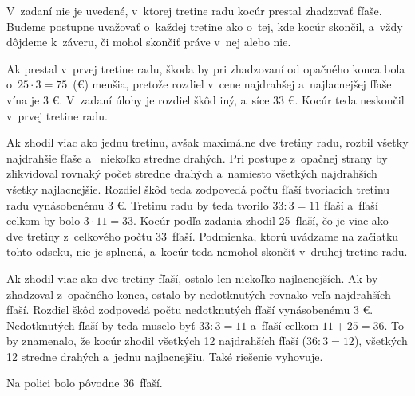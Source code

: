 {%
V~zadaní nie je uvedené, v~ktorej tretine radu kocúr prestal zhadzovať fľaše.
Budeme postupne uvažovať o~každej tretine ako o~tej, kde kocúr skončil, a~vždy
dôjdeme k~záveru, či mohol skončiť práve v~nej alebo nie.

Ak prestal v~prvej tretine radu, škoda by pri zhadzovaní od opačného konca
bola o~$25\cdot3 = 75$~(\euro) menšia, pretože rozdiel v~cene najdrahšej
a~najlacnejšej fľaše vína je 3 €. V~zadaní úlohy je rozdiel škôd iný, a~síce 33 €.
Kocúr teda neskončil v~prvej tretine radu.

Ak zhodil viac ako jednu tretinu, avšak maximálne dve tretiny radu, rozbil
všetky najdrahšie fľaše a~ niekoľko stredne drahých. Pri postupe z~opačnej
strany by zlikvidoval rovnaký počet stredne drahých a~namiesto všetkých najdrahších
všetky najlacnejšie. Rozdiel škôd teda zodpovedá počtu fľaší tvoriacich tretinu
radu vynásobenému 3 €. Tretinu radu by teda tvorilo $33:3=11$ fľaší
a~fľaší celkom by bolo $3\cdot 11 = 33$. Kocúr podľa zadania zhodil 25~fľaší, čo je
viac ako dve tretiny z~celkového počtu 33~fľaší. Podmienka, ktorú uvádzame na začiatku tohto
odseku, nie je splnená, a~kocúr teda nemohol skončiť v~druhej tretine radu.

Ak zhodil viac ako dve tretiny fľaší, ostalo len niekoľko
najlacnejších. Ak by zhadzoval z~opačného konca, ostalo by nedotknutých rovnako veľa
najdrahších fľaší. Rozdiel škôd zodpovedá počtu nedotknutých fľaší vynásobenému
3 €. Nedotknutých fľaší by teda muselo byť $33 : 3 = 11$ a~fľaší celkom $11
+ 25 = 36$. To by znamenalo, že kocúr zhodil všetkých 12 najdrahších fľaší ($36
: 3 = 12$), všetkých 12 stredne drahých a~jednu najlacnejšiu. Také riešenie vyhovuje.

Na polici bolo pôvodne 36~fľaší.
}

